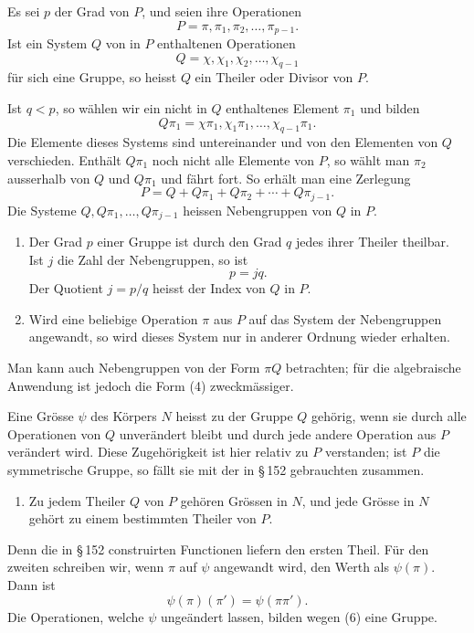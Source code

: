 \documentclass[11pt]{article}
\begin{document}
Es sei $p$ der Grad von $P$, und seien ihre Operationen
\[
        P=\pi,\pi_1,
\pi_2,\ldots,
\pi_{p-1}.
\tag{1}
\]
Ist ein System $Q$ von in $P$ enthaltenen Operationen
\[
        Q=\chi,
\chi_1,
\chi_2,
\ldots,
\chi_{q-1}
\tag{2}
\]
für sich eine Gruppe, so heisst $Q$ ein Theiler oder Divisor von $P$.

Ist $q<p$, so wählen wir ein nicht in $Q$ enthaltenes Element $\pi_1$ und bilden
\[
        Q\pi_1=\chi\pi_1,
\chi_1\pi_1,
\ldots,
\chi_{q-1}\pi_1.
\tag{3}
\]
Die Elemente dieses Systems sind untereinander und von den Elementen von $Q$ verschieden. Enthält $Q\pi_1$ noch nicht alle Elemente von $P$, so wählt man $\pi_2$ ausserhalb von $Q$ und $Q\pi_1$ und fährt fort. So erhält man eine Zerlegung
\[
        P=Q+Q\pi_1+Q\pi_2+\cdots+Q\pi_{j-1}.
\tag{4}
\]
Die Systeme $Q,Q\pi_1,
\ldots,Q\pi_{j-1}$ heissen Nebengruppen von $Q$ in $P$.

\begin{enumerate}[label=\arabic*.,leftmargin=2em]
\item Der Grad $p$ einer Gruppe ist durch den Grad $q$ jedes ihrer Theiler theilbar. Ist $j$ die Zahl der Nebengruppen, so ist
\[
        p=jq.
\tag{5}
\]
Der Quotient $j=p/q$ heisst der Index von $Q$ in $P$.
\item Wird eine beliebige Operation $\pi$ aus $P$ auf das System der Nebengruppen angewandt, so wird dieses System nur in anderer Ordnung wieder erhalten.
\end{enumerate}

Man kann auch Nebengruppen von der Form $\pi Q$ betrachten; für die algebraische Anwendung ist jedoch die Form (4) zweckmässiger.

Eine Grösse $\psi$ des Körpers $N$ heisst zu der Gruppe $Q$ gehörig, wenn sie durch alle Operationen von $Q$ unverändert bleibt und durch jede andere Operation aus $P$ verändert wird. Diese Zugehörigkeit ist hier relativ zu $P$ verstanden; ist $P$ die symmetrische Gruppe, so fällt sie mit der in \S\,152 gebrauchten zusammen.

\begin{enumerate}[label=\arabic*.,leftmargin=2em,start=3]
\item Zu jedem Theiler $Q$ von $P$ gehören Grössen in $N$, und jede Grösse in $N$ gehört zu einem bestimmten Theiler von $P$.
\end{enumerate}

Denn die in \S\,152 construirten Functionen liefern den ersten Theil. Für den zweiten schreiben wir, wenn $\pi$ auf $\psi$ angewandt wird, den Werth als $\psi(\pi)$. Dann ist
\[
        \psi(\pi)(\pi')=\psi(\pi\pi').
\tag{6}
\]
Die Operationen, welche $\psi$ ungeändert lassen, bilden wegen (6) eine Gruppe.
\end{document}
